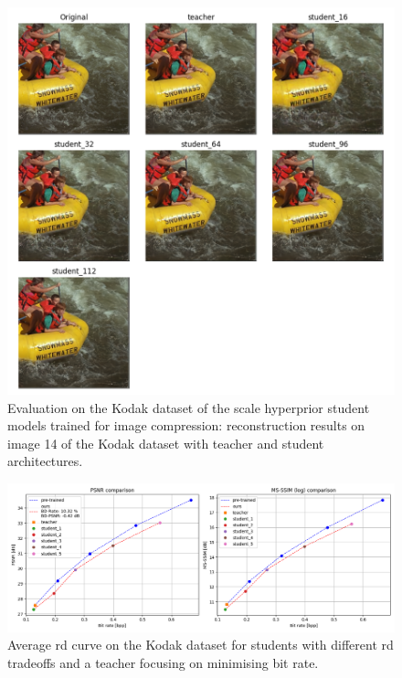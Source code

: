 \begin{figure}
    \centering
    \includegraphics[width=15cm]{img/kd_lic_kodak_14.png}
    \caption[Evaluation on the Kodak dataset of the scale hyperprior student models trained for image compression: reconstruction results on image 14 of the Kodak dataset with teacher and student architectures.]{Evaluation on the Kodak dataset of the scale hyperprior student models trained for image compression: reconstruction results on image 14 of the Kodak dataset with teacher and student architectures.}
    \label{appendix:kd_lic_2:a}
\end{figure}

\begin{figure}
    \centering
    \includegraphics[width=15cm]{img/kd_lic_rd_lambda_2.png}
    \caption[Average \acrshort{rd} curve on the Kodak dataset for students with different \acrshort{rd} tradeoffs and a teacher focusing on minimising bit rate.]{Average \acrshort{rd} curve on the Kodak dataset for students with different \acrshort{rd} tradeoffs and a teacher focusing on minimising bit rate.}
    \label{appendix:kd_lic_4_bis}
\end{figure}

